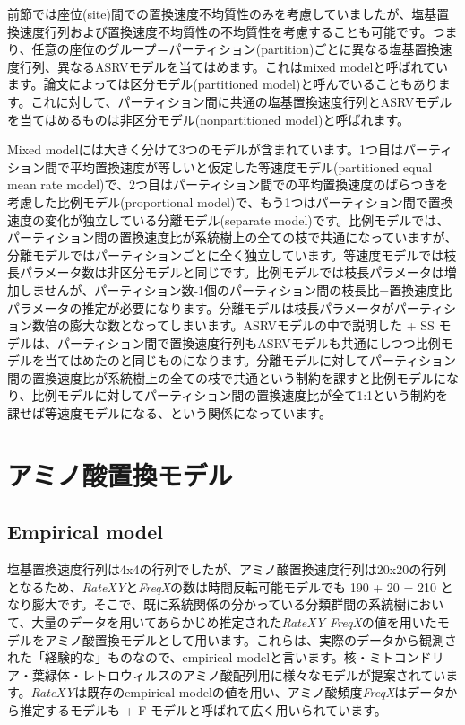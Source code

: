 \documentclass[titlepage,10pt,a4paper]{jsbook}
\begin{document}
前節では座位(site)間での置換速度不均質性のみを考慮していましたが、塩基置換速度行列および置換速度不均質性の不均質性を考慮することも可能です。つまり、任意の座位のグループ＝パーティション(partition)ごとに異なる塩基置換速度行列、異なるASRVモデルを当てはめます。これはmixed modelと呼ばれています。論文によっては区分モデル(partitioned model)と呼んでいることもあります。これに対して、パーティション間に共通の塩基置換速度行列とASRVモデルを当てはめるものは非区分モデル(nonpartitioned model)と呼ばれます。

Mixed modelには大きく分けて3つのモデルが含まれています。1つ目はパーティション間で平均置換速度が等しいと仮定した等速度モデル(partitioned equal mean rate model)で、2つ目はパーティション間での平均置換速度のばらつきを考慮した比例モデル(proportional model)で、もう1つはパーティション間で置換速度の変化が独立している分離モデル(separate model)です。比例モデルでは、パーティション間の置換速度比が系統樹上の全ての枝で共通になっていますが、分離モデルではパーティションごとに全く独立しています。等速度モデルでは枝長パラメータ数は非区分モデルと同じです。比例モデルでは枝長パラメータは増加しませんが、パーティション数-1個のパーティション間の枝長比=置換速度比パラメータの推定が必要になります。分離モデルは枝長パラメータがパーティション数倍の膨大な数となってしまいます。ASRVモデルの中で説明した + SS モデルは、パーティション間で置換速度行列もASRVモデルも共通にしつつ比例モデルを当てはめたのと同じものになります。分離モデルに対してパーティション間の置換速度比が系統樹上の全ての枝で共通という制約を課すと比例モデルになり、比例モデルに対してパーティション間の置換速度比が全て1:1という制約を課せば等速度モデルになる、という関係になっています。

\section{アミノ酸置換モデル}

\subsection{Empirical model}

塩基置換速度行列は4x4の行列でしたが、アミノ酸置換速度行列は20x20の行列となるため、\textit{RateXY}と\textit{FreqX}の数は時間反転可能モデルでも 190 + 20 = 210 となり膨大です。そこで、既に系統関係の分かっている分類群間の系統樹において、大量のデータを用いてあらかじめ推定された\textit{RateXY FreqX}の値を用いたモデルをアミノ酸置換モデルとして用います。これらは、実際のデータから観測された「経験的な」ものなので、empirical modelと言います。核\citep{Dayhoff1978,Henikoff1992,Jones1992,Muller2000,Whelan2001,Veerassamy2003,Le2008}・ミトコンドリア\citep{Adachi1996,Cao1998,Abascal2007}・葉緑体\citep{Adachi2000}・レトロウィルス\citep{Dimmic2002,Nickle2007}のアミノ酸配列用に様々なモデルが提案されています。\textit{RateXY}は既存のempirical modelの値を用い、アミノ酸頻度\textit{FreqX}はデータから推定するモデルも + F モデルと呼ばれて広く用いられています。
\end{document}
